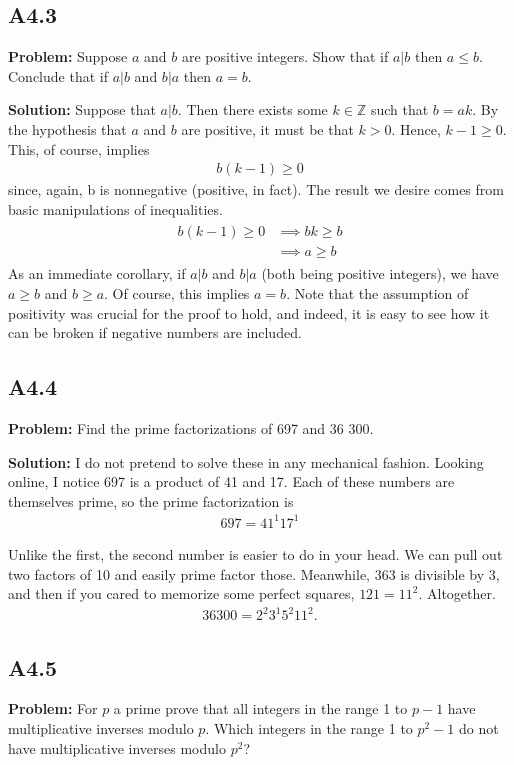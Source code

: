 \documentclass{article}
\begin{document}
\subsection*{A4.3} 
\textbf{Problem:} Suppose $a$ and $b$ are positive integers. Show that if $a|b$ then $a\leq b$. Conclude that if $a|b$ and $b|a$ then $a=b$.

\textbf{Solution:} Suppose that $a|b$. Then there exists some $k\in \mathbb{Z}$ such that $b = ak$. By the hypothesis that $a$ and $b$ are positive, it must be that $k>0$. Hence, $k-1\geq0$. This, of course, implies
\begin{align}
    b(k-1) \geq 0
\end{align}
since, again, b is nonnegative (positive, in fact). The result we desire comes from basic manipulations of inequalities.
\begin{align}
\begin{aligned}
    b(k-1) \geq 0 &\implies bk \geq b \\
    &\implies a \geq b
\end{aligned}
\end{align}
As an immediate corollary, if $a|b$ and $b|a$ (both being positive integers), we have $a\geq b$ and $b\geq a$. Of course, this implies $a = b$. Note that the assumption of positivity was crucial for the proof to hold, and indeed, it is easy to see how it can be broken if negative numbers are included.

\subsection*{A4.4}
\textbf{Problem:} Find the prime factorizations of 697 and 36 300.

\textbf{Solution:} I do not pretend to solve these in any mechanical fashion. Looking online, I notice 697 is a product of 41 and 17. Each of these numbers are themselves prime, so the prime factorization is 
\begin{align}
    697 =41^1 17^1
\end{align}

Unlike the first, the second number is easier to do in your head. We can pull out two factors of 10 and easily prime factor those. Meanwhile, 363 is divisible by 3, and then if you cared to memorize some perfect squares, $121= 11^2$. Altogether.
\begin{align}
    36300 = 2^2 3^1 5^2 11^2.
\end{align}

\subsection*{A4.5}
\textbf{Problem:} For $p$ a prime prove that all integers in the range 1 to $p-1$ have multiplicative inverses modulo $p$. Which integers in the range 1 to $p^2-1$ do not have multiplicative inverses modulo $p^2$?
\end{document}
